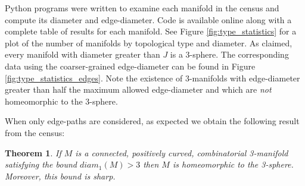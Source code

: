\documentclass[12pt]{article}
\theoremstyle{plain}
\newtheorem{theorem}{Theorem}
\theoremstyle{definition}
\theoremstyle{remark}
\begin{document}
Python programs were written to examine each manifold in the census and compute its diameter and edge-diameter. Code is available online \cite{Gintautas_Trout_github_manifold} along with a complete table of results for each manifold. See Figure \ref{fig:type_statistics} for a plot of the number of manifolds by topological type and diameter. As claimed, every manifold with diameter greater than $J$ is a 3-sphere. The corresponding data using the coarser-grained edge-diameter can be found in Figure \ref{fig:type_statistics_edges}. Note the existence of $3$-manifolds with edge-diameter greater than half the maximum allowed edge-diameter and which are {\em not} homeomorphic to the 3-sphere.

When only edge-paths are considered, as expected we obtain the following result from the census:

\begin{theorem} If $M$ is a connected, positively curved, combinatorial 3-manifold satisfying the bound $diam_1(M) > 3$ then $M$ is homeomorphic to the 3-sphere. Moreover, this bound is sharp.
\end{theorem}
\end{document}
